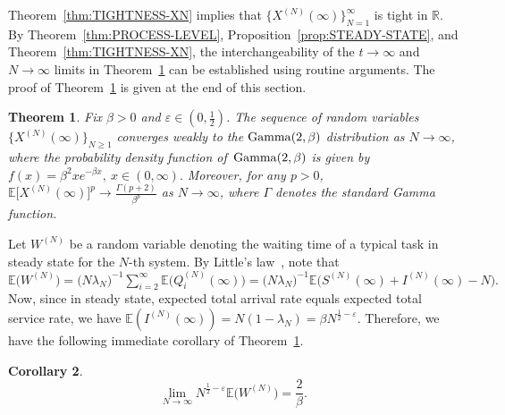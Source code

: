\documentclass[11pt, reqno]{article}
\DeclarePairedDelimiter\autobracket{(}{)}
\newcommand{\br}[1]{\autobracket*{#1}}
\newtheorem{theorem}{Theorem}
\newtheorem{corollary}[theorem]{Corollary}
\newtheorem{remark}[theorem]{Remark}
\numberwithin{equation}{section}
\numberwithin{theorem}{section}
\newcommand{\newGamma}{\mathrm{Gamma}}
\newcommand{\R}{\mathbb{R}}                 %
\newcommand{\E}{\mathbb{E}}                 %
\begin{document}
Theorem~\ref{thm:TIGHTNESS-XN} implies that $\big\{X^{(N)}(\infty)\big\}_{N=1}^{\infty}$ is tight in $\R$. 
By Theorem~\ref{thm:PROCESS-LEVEL}, Proposition~\ref{prop:STEADY-STATE}, and Theorem~\ref{thm:TIGHTNESS-XN}, the interchangeability of the $t\to\infty$ and $N\to\infty$ limits in Theorem~\ref{thm:INTERCHANGE} can be established using routine arguments.
The proof of Theorem~\ref{thm:INTERCHANGE} is given at the end of this section.
\begin{theorem}\label{thm:INTERCHANGE}
Fix $\beta>0$ and $\varepsilon \in (0, \frac{1}{2})$. The sequence of random variables $\big\{X^{(N)}(\infty)\big\}_{N\geq 1}$ converges weakly to the $\newGamma\br{2,\beta}$ distribution as $N\rightarrow\infty$, where the probability density function of\ $\newGamma\br{2,\beta}$ is given by 
$
    f(x)=\beta^2xe^{-\beta x},\ x\in(0,\infty).
$
Moreover, for any $p>0$, $\E \Big[X^{(N)}(\infty)\Big]^p\rightarrow \frac{\Gamma(p+2)}{\beta^p}$
as $N\to\infty$, where $\Gamma$ denotes the standard Gamma function. 
\end{theorem}


Let $W^{(N)}$ be a random variable denoting the waiting time of a typical task in steady state for the $N$-th system.
By Little's law~\cite[$\S$ 6.4~(a)]{LST19}, note that $\E\big(W^{(N)}\big) = \big(N\lambda_N\big)^{-1}\sum_{i = 2}^\infty \E\big(Q_i^{(N)}(\infty)\big) = \big(N\lambda_N\big)^{-1}\E\big(S^{(N)}(\infty)+I^{(N)}(\infty)-N\big).$
Now, since in steady state, expected total arrival rate equals expected total service rate, we have $\E(I^{(N)}(\infty)) = N(1-\lambda_N) = \beta N^{\frac{1}{2}- \varepsilon}$. 
Therefore, we have the following immediate corollary of Theorem~\ref{thm:INTERCHANGE}.
\begin{corollary}\label{cor:main-1}
 $$\lim_{N\to\infty}N^{\frac{1}{2} - \varepsilon}\E\big(W^{(N)}\big) = \frac{2}{\beta}.$$
\end{corollary}
\end{document}
